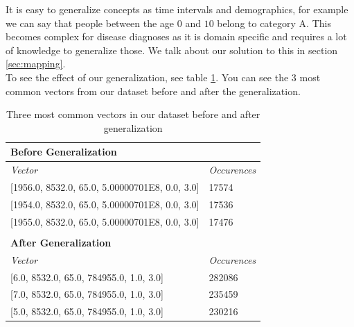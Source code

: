 It is easy to generalize concepts as time intervals and demographics, for example we can say that people between the age $0$ and $10$ belong to category A. This becomes complex for disease diagnoses as it is domain specific and requires a lot of knowledge to generalize those. We talk about our solution to this in section \ref{sec:mapping}. \\

To see the effect of our generalization, see table \ref{tab:general}. You can see the $3$ most common vectors from our dataset before and after the generalization. \\

\begin{table}[]
\centering

\label{tab:general}
\begin{tabular}{ll}
\cline{1-1}
\multicolumn{1}{|l|}{\textbf{Before Generalization}}                     & {\ul }                                   \\ \hline
\multicolumn{1}{|l|}{\textit{Vector}}                                    & \multicolumn{1}{l|}{\textit{Occurences}} \\ \hline
\multicolumn{1}{|l|}{{[}1956.0, 8532.0, 65.0, 5.00000701E8, 0.0, 3.0{]}} & \multicolumn{1}{l|}{17574}               \\ \hline
\multicolumn{1}{|l|}{{[}1954.0, 8532.0, 65.0, 5.00000701E8, 0.0, 3.0{]}} & \multicolumn{1}{l|}{17536}               \\ \hline
\multicolumn{1}{|l|}{{[}1955.0, 8532.0, 65.0, 5.00000701E8, 0.0, 3.0{]}} & \multicolumn{1}{l|}{17476}               \\ \hline
                                                                         &                                          \\ \cline{1-1}
\multicolumn{1}{|l|}{\textbf{After Generalization}}                      &                                          \\ \hline
\multicolumn{1}{|l|}{\textit{Vector}}                                    & \multicolumn{1}{l|}{\textit{Occurences}} \\ \hline
\multicolumn{1}{|l|}{{[}6.0, 8532.0, 65.0, 784955.0, 1.0, 3.0{]}}        & \multicolumn{1}{l|}{282086}              \\ \hline
\multicolumn{1}{|l|}{{[}7.0, 8532.0, 65.0, 784955.0, 1.0, 3.0{]}}        & \multicolumn{1}{l|}{235459}              \\ \hline
\multicolumn{1}{|l|}{{[}5.0, 8532.0, 65.0, 784955.0, 1.0, 3.0{]}}        & \multicolumn{1}{l|}{230216}              \\ \hline
\end{tabular}

\caption{Three most common vectors in our dataset before and after generalization}
\end{table}


